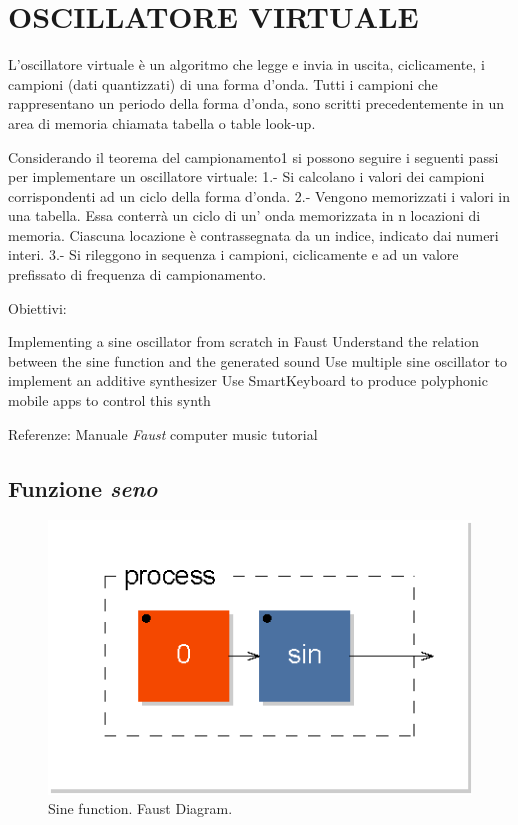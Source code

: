
\section{OSCILLATORE VIRTUALE}

L’oscillatore virtuale è un algoritmo che legge e invia in uscita,
ciclicamente, i campioni (dati quantizzati) di una forma d’onda.
Tutti i campioni che rappresentano un periodo della forma d’onda,
sono scritti precedentemente in un area di memoria chiamata tabella o table look-up.

Considerando il teorema del campionamento1 si possono seguire i seguenti passi per implementare un oscillatore virtuale:
1.- Si calcolano i valori dei campioni corrispondenti ad un ciclo della forma d’onda.
2.- Vengono memorizzati i valori in una tabella. Essa conterrà un ciclo di un' onda memorizzata in n locazioni di memoria. Ciascuna locazione è contrassegnata da un indice, indicato dai numeri interi.
3.- Si rileggono in sequenza i campioni, ciclicamente e ad un valore prefissato di frequenza di campionamento.


Obiettivi:

Implementing a sine oscillator from scratch in Faust
Understand the relation between the sine function and the generated sound
Use multiple sine oscillator to implement an additive synthesizer
Use SmartKeyboard to produce polyphonic mobile apps to control this synth

Referenze:
Manuale \emph{Faust}
computer music tutorial

\subsection{Funzione \emph{seno}}

\begin{figure}[ht]
  \centering
  \includegraphics[]{CAPITOLI/0700/CODES/0701-seno-svg/process}
  \caption{Sine function. Faust Diagram.}
  \label{fdsine}
\end{figure}

